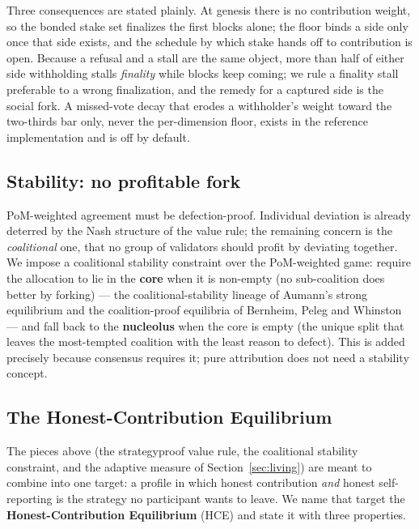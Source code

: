\documentclass[10pt]{article}
\begin{document}
Three consequences are stated plainly. At genesis there is no contribution weight, so the bonded stake
set finalizes the first blocks alone; the floor binds a side only once that side exists, and the
schedule by which stake hands off to contribution is open. Because a refusal and a stall are the same
object, more than half of either side withholding stalls \emph{finality} while blocks keep coming; we
rule a finality stall preferable to a wrong finalization, and the remedy for a captured side is the
social fork. A missed-vote decay that erodes a withholder's weight toward the two-thirds bar only, never
the per-dimension floor, exists in the reference implementation and is off by default.

\subsection{Stability: no profitable fork}

PoM-weighted agreement must be defection-proof. Individual deviation is already deterred by the Nash
structure of the value rule; the remaining concern is the \emph{coalitional} one, that no group of
validators should profit by deviating together.
We impose a coalitional stability constraint over the PoM-weighted game: require the allocation to lie
in the \textbf{core} when it is non-empty (no sub-coalition does better by forking) --- the
coalitional-stability lineage of Aumann's strong equilibrium and the coalition-proof equilibria of
Bernheim, Peleg and Whinston --- and fall back to the \textbf{nucleolus} when the core is empty (the
unique split that leaves the most-tempted coalition with the least reason to defect). This is added precisely because consensus requires it;
pure attribution does not need a stability concept.

\subsection{The Honest-Contribution Equilibrium}\label{sec:hce}

The pieces above (the strategyproof value rule, the coalitional stability constraint, and the adaptive
measure of Section~\ref{sec:living}) are meant to combine into one target: a profile in which honest
contribution \emph{and} honest self-reporting is the strategy no participant wants to leave. We name
that target the \textbf{Honest-Contribution Equilibrium} (HCE) and state it with three properties.
\end{document}
